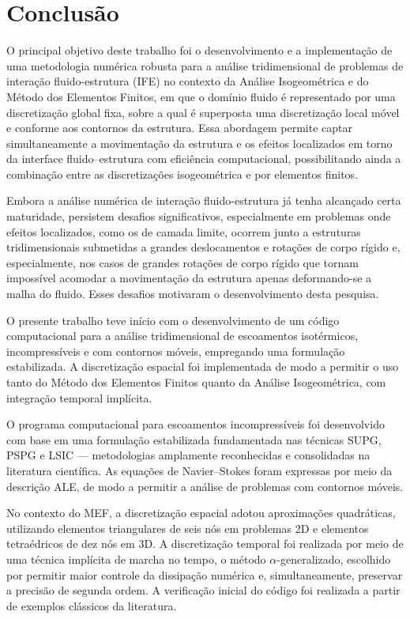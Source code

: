 \chapter{Conclusão} 

O principal objetivo deste trabalho foi o desenvolvimento e a implementação de uma metodologia numérica robusta para a análise tridimensional de problemas de interação fluido-estrutura (IFE) no contexto da Análise Isogeométrica e do Método dos Elementos Finitos, em que o domínio fluido é representado por uma discretização global fixa, sobre a qual é superposta uma discretização local móvel e conforme aos contornos da estrutura. Essa abordagem permite captar simultaneamente a movimentação da estrutura e os efeitos localizados em torno da interface fluido–estrutura com eficiência computacional, possibilitando ainda a combinação entre as discretizações isogeométrica e por elementos finitos.

Embora a análise numérica de interação fluido-estrutura já tenha alcançado certa maturidade, persistem desafios significativos, especialmente em problemas onde efeitos localizados, como os de camada limite, ocorrem junto a estruturas tridimensionais submetidas a grandes deslocamentos e rotações de corpo rígido e, especialmente, nos casos de grandes rotações de corpo rígido que tornam impossível acomodar a movimentação da estrutura apenas deformando-se a malha do fluido. Esses desafios motivaram o desenvolvimento desta pesquisa.

O presente trabalho teve início com o desenvolvimento de um código computacional para a análise tridimensional de escoamentos isotérmicos, incompressíveis e com contornos móveis, empregando uma formulação estabilizada. A discretização espacial foi implementada de modo a permitir o uso tanto do Método dos Elementos Finitos quanto da Análise Isogeométrica, com integração temporal implícita. 

O programa computacional para escoamentos incompressíveis foi desenvolvido com base em uma formulação estabilizada fundamentada nas técnicas SUPG, PSPG e LSIC — metodologias amplamente reconhecidas e consolidadas na literatura científica. As equações de Navier–Stokes foram expressas por meio da descrição ALE, de modo a permitir a análise de problemas com contornos móveis.

No contexto do MEF, a discretização espacial adotou aproximações quadráticas, utilizando elementos triangulares de seis nós em problemas 2D e elementos tetraédricos de dez nós em 3D. A discretização temporal foi realizada por meio de uma técnica implícita de marcha no tempo, o método $\alpha$-generalizado, escolhido por permitir maior controle da dissipação numérica e, simultaneamente, preservar a precisão de segunda ordem. A verificação inicial do código foi realizada a partir de exemplos clássicos da literatura.

